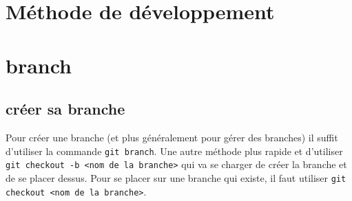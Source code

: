 \documentclass[a4paper,10pt]{report}
\begin{document}
  \section{Méthode de développement}
  \section{branch}
     \subsection{créer sa branche}
     Pour créer une branche (et plus généralement pour gérer des branches) il suffit d'utiliser la commande \verb|git branch|. Une autre méthode plus rapide et d'utiliser \verb|git checkout -b <nom de la branche>| qui va se charger de créer la branche et de se placer dessus. Pour se placer sur une branche qui existe, il faut utiliser \verb|git checkout <nom de la branche>|.
\end{document}
